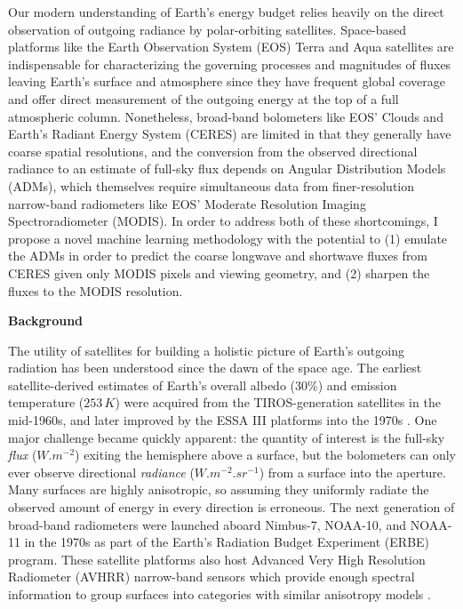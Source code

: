 \documentclass[11pt]{article}
\begin{document}
Our modern understanding of Earth's energy budget relies heavily on the direct observation of outgoing radiance by polar-orbiting satellites. Space-based platforms like the Earth Observation System (EOS) Terra and Aqua satellites are indispensable for characterizing the governing processes and magnitudes of fluxes leaving Earth's surface and atmosphere since they have frequent global coverage and offer direct measurement of the outgoing energy at the top of a full atmospheric column. Nonetheless, broad-band bolometers like EOS' Clouds and Earth's Radiant Energy System (CERES) are limited in that they generally have coarse spatial resolutions, and the conversion from the observed directional radiance to an estimate of full-sky flux depends on Angular Distribution Models (ADMs), which themselves require simultaneous data from finer-resolution narrow-band radiometers like EOS' Moderate Resolution Imaging Spectroradiometer (MODIS). In order to address both of these shortcomings, I propose a novel machine learning methodology with the potential to (1) emulate the ADMs in order to predict the coarse longwave and shortwave fluxes from CERES given only MODIS pixels and viewing geometry, and (2) sharpen the fluxes to the MODIS resolution.

\vspace{1em}

\noindent
{\large\textbf{Background}}

The utility of satellites for building a holistic picture of Earth's outgoing radiation has been understood since the dawn of the space age. The earliest satellite-derived estimates of Earth's overall albedo (30\%) and emission temperature ($253\,\si{K}$) were acquired from the TIROS-generation satellites in the mid-1960s, and later improved by the ESSA III platforms into the 1970s \cite{haar_measurements_1971}\cite{suomi_theoretical_1967}. One major challenge became quickly apparent: the quantity of interest is the full-sky \textit{flux} ($\si{W.m^{-2}}$) exiting the hemisphere above a surface, but the bolometers can only ever observe directional \textit{radiance} ($\si{W.m^{-2}.sr^{-1}}$) from a surface into the aperture. Many surfaces are highly anisotropic, so assuming they uniformly radiate the observed amount of energy in every direction is erroneous. The next generation of broad-band radiometers were launched aboard Nimbus-7, NOAA-10, and NOAA-11 in the 1970s as part of the Earth's Radiation Budget Experiment (ERBE) program. These satellite platforms also host Advanced Very High Resolution Radiometer (AVHRR) narrow-band sensors which provide enough spectral information to group surfaces into categories with similar anisotropy models \cite{ramanathan_cloud-radiative_1989}\cite{smith_inversion_1986}.
\end{document}
